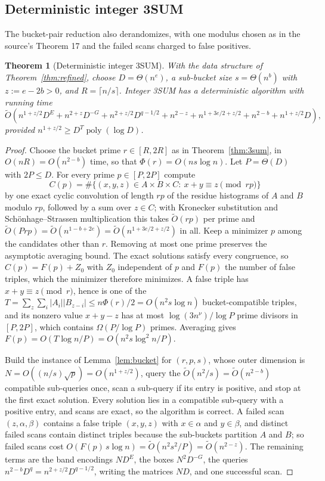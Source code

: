 \documentclass[11pt]{article}
\newtheorem{theorem}{Theorem}
\newcommand{\softO}{\widetilde O}
\begin{document}
\subsection*{Deterministic integer 3SUM}
The bucket-pair reduction also derandomizes, with one modulus chosen as in
the source's Theorem 17 and the failed scans charged to false positives.
\begin{theorem}[Deterministic integer 3SUM]
\label{thm:det3sum}
With the data structure of Theorem~\ref{thm:refined}, choose
$D=\Theta(n^e)$, a sub-bucket size $s=\Theta(n^b)$ with $z:=e-2b>0$, and
$R=\lceil n/s\rceil$. Integer 3SUM has a deterministic algorithm with
running time
\[
\softO\left(n^{1+z/2}D^E+n^{2+z}D^{-G}+n^{2+z/2}D^{q-1/2}+n^{2-z}
+n^{1+3e/2+z/2}+n^{2-b}+n^{1+z/2}D\right),
\]
provided $n^{1+z/2}\ge D^T\operatorname{poly}(\log D)$.
\end{theorem}
\begin{proof}
Choose the bucket prime $r\in[R,2R]$ as in Theorem~\ref{thm:3sum}, in
$O(nR)=O(n^{2-b})$ time, so that $\Phi(r)=O(ns\log n)$. Let $P=\Theta(D)$
with $2P\le D$. For every prime $p\in[P,2P]$ compute
\[
C(p)=\#\{(x,y,z)\in A\times B\times C:\ x+y\equiv z\pmod{rp}\}
\]
by one exact cyclic convolution of length $rp$ of the residue histograms of
$A$ and $B$ modulo $rp$, followed by a sum over $z\in C$; with Kronecker
substitution and Sch\"onhage--Strassen multiplication this takes
$\softO(rp)$ per prime and $\softO(Prp)=\softO(n^{1-b+2e})=\softO(n^{1+3e/2+z/2})$
in all. Keep a minimizer $p$ among the candidates other than $r$.
Removing at most one prime preserves the asymptotic averaging bound. The exact
solutions satisfy every congruence, so $C(p)=F(p)+Z_0$ with $Z_0$
independent of $p$ and $F(p)$ the number of false triples, which the
minimizer therefore minimizes. A false triple has $x+y\equiv z\pmod r$,
hence is one of the $T=\sum_z\sum_i|A_i||B_{z-i}|\le n\Phi(r)/2=O(n^2s\log n)$
bucket-compatible triples, and its nonzero value $x+y-z$ has at most
$\log(3n^\nu)/\log P$ prime divisors in $[P,2P]$, which contains
$\Omega(P/\log P)$ primes. Averaging gives
$F(p)=O(T\log n/P)=O(n^2s\log^2n/P)$.

Build the instance of Lemma~\ref{lem:bucket} for $(r,p,s)$, whose outer
dimension is $N=O((n/s)\sqrt p)=O(n^{1+z/2})$, query the
$\softO(n^2/s)=\softO(n^{2-b})$ compatible sub-queries once, scan a sub-query
if its entry is positive, and stop at the first exact solution. Every
solution lies in a compatible sub-query with a positive entry, and scans are
exact, so the algorithm is correct. A failed scan $(z,\alpha,\beta)$ contains
a false triple $(x,y,z)$ with $x\in\alpha$ and $y\in\beta$, and distinct
failed scans contain distinct triples because the sub-buckets partition $A$
and $B$; so failed scans cost $O(F(p)\,s\log n)=\softO(n^2s^2/P)=\softO(n^{2-z})$.
The remaining terms are the band encodings $ND^E$, the boxes $N^2D^{-G}$,
the queries $n^{2-b}D^q=n^{2+z/2}D^{q-1/2}$, writing the matrices $ND$, and
one successful scan.
\end{proof}
\end{document}
